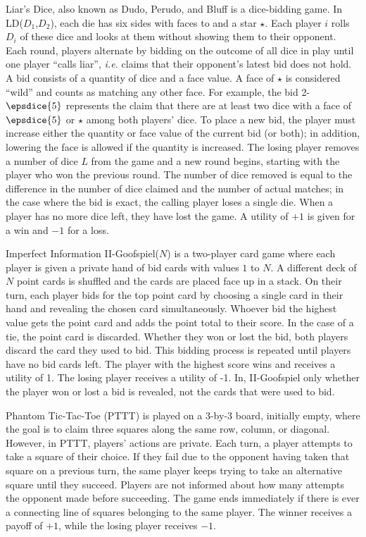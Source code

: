 \documentclass[letterpaper]{article}
\newcommand{\ie}{{\it i.e.}\xspace}
\begin{document}
Liar's Dice, also known as Dudo, Perudo, and Bluff is a dice-bidding game. 
In LD($D_1$,$D_2$), each die has six sides with faces  to  and a star $\star$. 
Each player $i$ rolls $D_i$ of these dice and looks at them without showing them to their opponent. 
Each round, players alternate by bidding on the outcome of all dice in play until one player ``calls liar'', 
\ie claims that their opponent's latest bid does not hold.
A bid consists of a quantity of dice and a face value.  
A face of $\star$ is considered ``wild'' and counts as matching any other face.
For example, the bid 2-$\epsdice{5}$ represents the claim that there are at least two dice with a face of 
$\epsdice{5}$ or $\star$ among both players' dice. 
To place a new bid, the player must increase either the quantity or face value of the current 
bid (or both); in addition, lowering the face is allowed if the quantity is increased. 
The losing player removes a number of dice $L$ from the game and a new round begins, starting
with the player who won the previous round. 
The number of dice removed is equal to the difference in the number of dice claimed and the number of actual 
matches; in the case where the bid is exact, the calling player loses a single die. 
When a player has no more dice left, they have lost the game. 
A utility of $+1$ is given for a win and $-1$ for a loss.

Imperfect Information II-Goofspiel($N$) is a two-player card game where each player is
given a private hand of bid cards with values $1$ to $N$. A different
deck of $N$ point cards is shuffled and the cards are placed face up
in a stack. On their turn, each player bids for the top point card by 
choosing a single card in their hand and revealing the chosen card simultaneously. 
Whoever bid the highest value gets the point card and adds the point total to their score.  
In the case of a tie, the point card is discarded.  Whether they won or
lost the bid, both players discard the card they used to bid.  
This bidding process is repeated until players have no bid cards left. 
The player with the highest score wins and receives a utility of 1. The losing player 
receives a utility of -1. In, II-Goofspiel only whether the player won or lost a bid is 
revealed, not the cards that were used to bid.  

Phantom Tic-Tac-Toe (PTTT) is played on a 3-by-3 board, 
initially empty, where the goal is to claim three squares along the same row, column, or diagonal. 
However, in PTTT, players' actions are private. 
Each turn, a player attempts to take a square of their choice. 
If they fail due to the opponent having taken that square on a previous turn, the same player 
keeps trying to take an alternative square until they succeed. 
Players are not informed about how many attempts the opponent made before succeeding. 
The game ends immediately if there is ever a connecting line of squares belonging to the same player. 
The winner receives a payoff of $+1$, while the losing player receives $-1$. 
\end{document}
